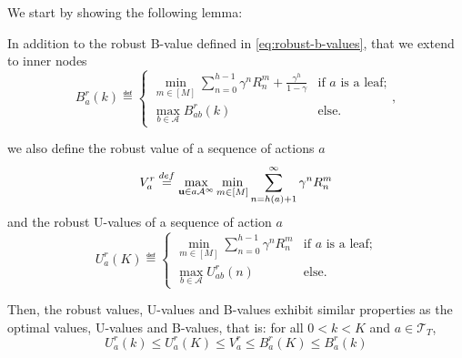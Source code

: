 \documentclass{article}
\begin{document}
We start by showing the following lemma:


\begin{lemma}
	In addition to the robust B-value defined in \eqref{eq:robust-b-values}, that we extend to inner nodes	
	\begin{equation}
	\label{eq:br}
	B_a^r(k)  \eqdef
	\begin{cases}
	\min_{m\in[M]} \sum_{n=0}^{h-1} \gamma^n R_n^m  + \frac{\gamma^h}{1-\gamma}&\text{if } a \text{ is a leaf;}\\
	\max_{b\in\mathcal{A}} B_{ab}^r(k) & \text{else.}
	\end{cases},
	\end{equation}
	
	we also define the robust value of a sequence of actions $a$
	\begin{equation}
	\label{eq:max_vr}
	V_a^r \stackrel{def}{=} \max_{\mathbf{u} \in a\mathcal{A^\infty}} \min_{m\in[M]} \sum_{n=h(a)+1}^\infty \gamma^n R^m_n
	\end{equation}
	and the robust U-values of a sequence of action $a$
	\begin{equation}
	\label{eq:ur}
	U_a^r(K)  \eqdef
	\begin{cases}
	\min_{m\in[M]} \sum_{n=0}^{h-1} \gamma^n R_n^m &\text{if } a \text{ is a leaf;}\\
	\max_{b\in\mathcal{A}} U_{ab}^r(n) & \text{else.}
	\end{cases}
	\end{equation}
	
	Then, the robust values, U-values and B-values exhibit similar properties as the optimal values, U-values and B-values, that is: for all $0 < k < K$ and $a\in\mathcal{T}_T$,
	\begin{equation}
	U^r_a(k) \leq U^r_a(K) \leq V^r_a \leq B^r_a(K) \leq B^r_a(k)
	\end{equation}
	\label{lemma:uvb}
\end{lemma}
\end{document}
